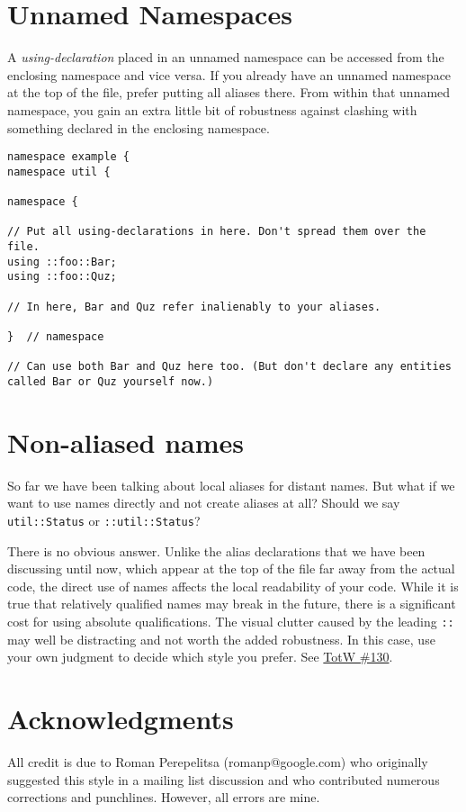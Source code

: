 \section{Unnamed Namespaces}\label{sec:unnamed-namespaces}

A \emph{using-declaration} placed in an unnamed namespace can be accessed from the enclosing namespace and vice versa. If you already have an unnamed namespace at the top of the file, prefer putting all aliases there. From within that unnamed namespace, you gain an extra little bit of robustness against clashing with something declared in the enclosing namespace.

\begin{verbatim}
namespace example {
namespace util {

namespace {

// Put all using-declarations in here. Don't spread them over the file.
using ::foo::Bar;
using ::foo::Quz;

// In here, Bar and Quz refer inalienably to your aliases.

}  // namespace

// Can use both Bar and Quz here too. (But don't declare any entities called Bar or Quz yourself now.)
\end{verbatim}

\section{Non-aliased names}
So far we have been talking about local aliases for distant names. But what if we want to use names directly and not create aliases at all? Should we say \texttt{util::Status} or \texttt{::util::Status}?

There is no obvious answer. Unlike the alias declarations that we have been discussing until now, which appear at the top of the file far away from the actual code, the direct use of names affects the local readability of your code. While it is true that relatively qualified names may break in the future, there is a significant cost for using absolute qualifications. The visual clutter caused by the leading \texttt{::} may well be distracting and not worth the added robustness. In this case, use your own judgment to decide which style you prefer. See \hyperref[ch:tip-of-the-week-130]{TotW \#130}.

\section{Acknowledgments}
All credit is due to Roman Perepelitsa (romanp@google.com) who originally suggested this style in a mailing list discussion and who contributed numerous corrections and punchlines. However, all errors are mine.
